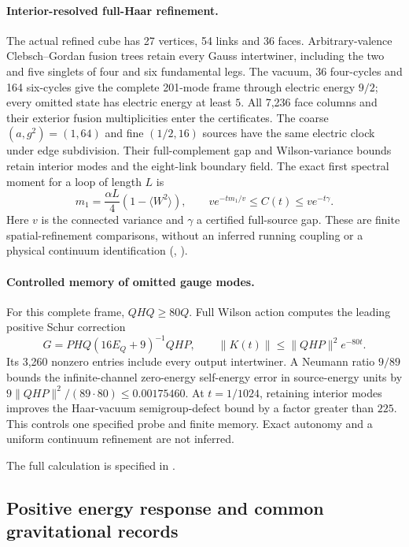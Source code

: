 \paragraph{Interior-resolved full-Haar refinement.}
The actual refined cube has 27 vertices, 54 links and 36 faces.
Arbitrary-valence Clebsch--Gordan fusion trees retain every Gauss
intertwiner, including the two and five singlets of four and six
fundamental legs. The vacuum, 36 four-cycles and 164 six-cycles give
the complete 201-mode frame through electric energy $9/2$; every
omitted state has electric energy at least $5$. All 7,236 face columns
and their exterior fusion multiplicities enter the certificates.
The coarse $(a,g^2)=(1,64)$ and fine $(1/2,16)$ sources have the same
electric clock under edge subdivision. Their full-complement gap and
Wilson-variance bounds retain interior modes and the eight-link boundary
field. The exact first spectral moment for a loop of length $L$ is
\[
 m_1=\frac{\alpha L}{4}(1-\langle W^2\rangle),\qquad
 v e^{-t m_1/v}\le C(t)\le v e^{-t\gamma}.
\]
Here $v$ is the connected variance and $\gamma$ a certified full-source
gap. These are finite spatial-refinement comparisons, without an
inferred running coupling or a physical continuum identification
(,
).

\paragraph{Controlled memory of omitted gauge modes.}
For this complete frame, $QHQ\ge80Q$. Full Wilson action computes the
leading positive Schur correction
\[
 G=PHQ(16E_Q+9)^{-1}QHP,
 \qquad \|K(t)\|\le\|QHP\|^2e^{-80t}.
\]
Its 3,260 nonzero entries include every output intertwiner. A Neumann
ratio $9/89$ bounds the infinite-channel zero-energy self-energy error in source-energy units by
$9\|QHP\|^2/(89\cdot80)\le0.00175460$.
At $t=1/1024$, retaining interior modes improves the Haar-vacuum
semigroup-defect bound by a factor greater than $225$. This controls
one specified probe and finite memory. Exact autonomy and a uniform
continuum refinement are not inferred.

The full calculation is specified in .

\subsection{Positive energy response and common gravitational records}

